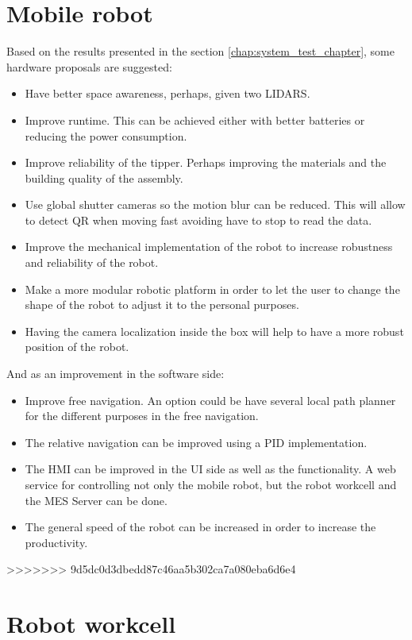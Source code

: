 	\section{Mobile robot} %
	\label{sub:mobile_robot}
	Based on the results presented in the section \ref{chap:system_test_chapter}, some hardware proposals are suggested:
	\begin{itemize}
		\item Have better space awareness, perhaps, given two LIDARS.
		\item Improve runtime. This can be achieved either with better batteries or reducing the power consumption.
		\item Improve reliability of the tipper. Perhaps improving the materials and the building quality of the assembly.
		\item Use global shutter cameras so the motion blur can be reduced. This will allow to detect QR when moving fast avoiding have to stop to read the data.
		\item Improve the mechanical implementation of the robot to increase robustness and reliability of the robot.
		\item Make a more modular robotic platform in order to let the user to change the shape of the robot to adjust it to the personal purposes.
		\item Having the camera localization inside the box will help to have a more robust position of the robot.
	\end{itemize}
	And as an improvement in the software side:
	\begin{itemize}
		\item Improve free navigation. An option could be have several local path planner for the different purposes in the free navigation.
		\item The relative navigation can be improved using a PID implementation.
		\item The HMI can be improved in the UI side as well as the functionality. A web service for controlling not only the mobile robot, but the robot workcell and the MES Server can be done.
		\item The general speed of the robot can be increased in order to increase the productivity.
	\end{itemize}
>>>>>>> 9d5dc0d3dbedd87c46aa5b302ca7a080eba6d6e4

	\section{Robot workcell} %
	\label{sub:robot_workcell}
